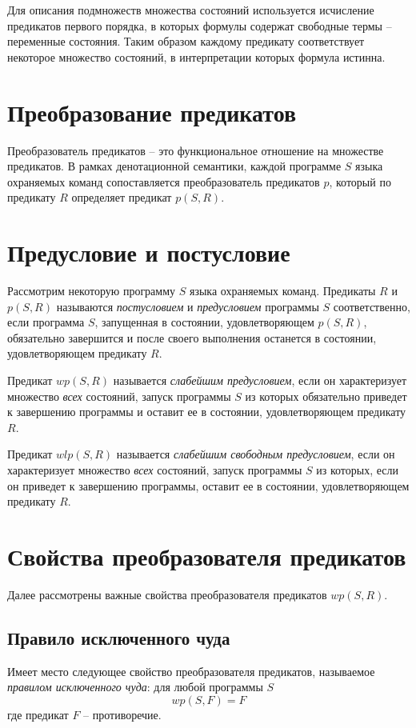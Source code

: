 Для описания подмножеств множества состояний используется 
исчисление предикатов первого порядка, в которых формулы содержат свободные термы -- 
переменные состояния. Таким образом каждому предикату соответствует некоторое множество состояний,
в интерпретации которых формула истинна.

\section{Преобразование предикатов}
Преобразователь предикатов -- это функциональное отношение на множестве предикатов.
В рамках денотационной семантики, каждой программе $S$ языка охраняемых
команд сопоставляется преобразователь предикатов $p$, который по предикату
$R$ определяет предикат $p(S, R)$.

\section{Предусловие и постусловие}
Рассмотрим некоторую программу $S$ языка охраняемых команд. Предикаты $R$ и $p(S, R)$ 
называются \textit{постусловием} и \textit{предусловием} программы $S$ соответственно, 
если программа $S$, запущенная в состоянии, удовлетворяющем $p(S,R)$, 
обязательно завершится и после своего выполнения останется в состоянии,
удовлетворяющем предикату $R$.

Предикат $wp(S, R)$ называется \textit{слабейшим предусловием}, если он 
характеризует множество \textit{всех} состояний, запуск программы $S$ из которых
обязательно приведет к завершению программы и оставит ее в состоянии,
удовлетворяющем предикату $R$.

Предикат $wlp(S, R)$ называется \textit{слабейшим свободным предусловием}, если он 
характеризует множество \textit{всех} состояний, запуск программы $S$ из которых,
если он приведет к завершению программы, оставит ее в состоянии, удовлетворяющем предикату $R$.

\section{Свойства преобразователя предикатов}
Далее рассмотрены важные свойства преобразователя предикатов $wp(S,R)$.
\subsection{Правило исключенного чуда}
Имеет место следующее свойство преобразователя предикатов,
называемое \textit{правилом исключенного чуда}: для любой программы $S$
\begin{equation}
	wp(S, F) = F
\end{equation}
где предикат $F$ -- противоречие.

